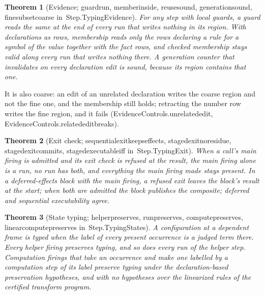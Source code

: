 \documentclass[11pt]{article}
\newtheorem{theorem}{Theorem}
\theoremstyle{remark}
\newcommand{\lean}[1]{{\ttfamily\def\_{\textunderscore\allowbreak}#1}}
\newcommand{\inmod}[1]{in~{\ttfamily\def\_{\textunderscore\allowbreak}#1}}
\begin{document}
\begin{theorem}[Evidence; \lean{guard\_run}, \lean{member\_inside}, \lean{reuse\_sound}, \lean{generation\_sound}, \lean{fine\_subset\_coarse} \inmod{Step.TypingEvidence}]
For any step with local guards, a guard reads the same at the end of every run that writes nothing in
its region. With declarations as rows, membership reads only the rows declaring a rule for a symbol of
the value together with the fact rows, and checked membership stays valid along every run that writes
nothing there. A generation counter that invalidates on every declaration edit is sound, because its
region contains that one.
\end{theorem}
It is also coarse: an edit of an unrelated declaration writes the coarse region and not the fine one,
and the membership still holds; retracting the number row writes the fine region, and it fails
(\lean{EvidenceControls.unrelated\_edit}, \lean{EvidenceControls.related\_edit\_breaks}).

\begin{theorem}[Exit check; \lean{sequential\_exit\_keeps\_effects}, \lean{staged\_exit\_no\_residue}, \lean{staged\_exit\_commits}, \lean{staged\_executable\_iff} \inmod{Step.TypingExit}]
When a call's main firing is admitted and its exit check is refused at the result, the main firing
alone is a run, no run has both, and everything the main firing made stays present. In a
deferred-effects block with the main firing, a refused exit leaves the block's result at the start;
when both are admitted the block publishes the composite; deferred and sequential executability agree.
\end{theorem}

\begin{theorem}[State typing; \lean{helper\_preserves}, \lean{run\_preserves}, \lean{compute\_preserves}, \lean{linear\_compute\_preserves} \inmod{Step.TypingStates}]
A configuration at a dependent frame is typed when the label of every present occurrence is a judged
term there. Every helper firing preserves typing, and so does every run of the helper step. Computation
firings that take an occurrence and make one labelled by a computation step of its label preserve
typing under the declaration-based preservation hypotheses, and with no hypotheses over the linearized
rules of the certified transform program.
\end{theorem}
\end{document}

